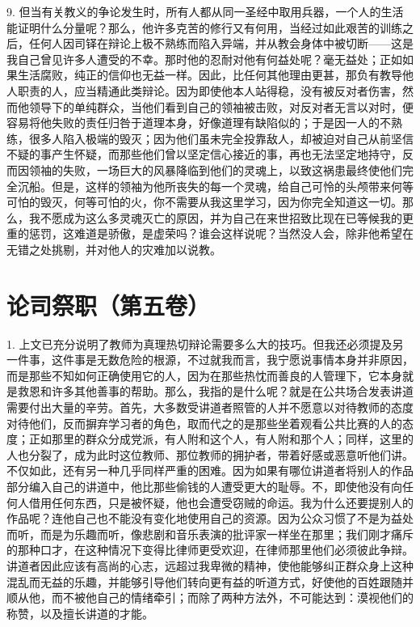 9. 但当有关教义的争论发生时，所有人都从同一圣经中取用兵器，一个人的生活能证明什么分量呢？那么，他许多克苦的修行又有何用，当经过如此艰苦的训练之后，任何人因司铎在辩论上极不熟练而陷入异端，并从教会身体中被切断——这是我自己曾见许多人遭受的不幸。那时他的忍耐对他有何益处呢？毫无益处；正如如果生活腐败，纯正的信仰也无益一样。因此，比任何其他理由更甚，那负有教导他人职责的人，应当精通此类辩论。因为即使他本人站得稳，没有被反对者伤害，然而他领导下的单纯群众，当他们看到自己的领袖被击败，对反对者无言以对时，便容易将他失败的责任归咎于道理本身，好像道理有缺陷似的；于是因一人的不熟练，很多人陷入极端的毁灭；因为他们虽未完全投靠敌人，却被迫对自己从前坚信不疑的事产生怀疑，而那些他们曾以坚定信心接近的事，再也无法坚定地持守，反而因领袖的失败，一场巨大的风暴降临到他们的灵魂上，以致这祸患最终使他们完全沉船。但是，这样的领袖为他所丧失的每一个灵魂，给自己可怜的头颅带来何等可怕的毁灭，何等可怕的火，你不需要从我这里学习，因为你完全知道这一切。那么，我不愿成为这么多灵魂灭亡的原因，并为自己在来世招致比现在已等候我的更重的惩罚，这难道是骄傲，是虚荣吗？谁会这样说呢？当然没人会，除非他希望在无错之处挑剔，并对他人的灾难加以说教。\par



\section{论司祭职（第五卷）}

1. 上文已充分说明了教师为真理热切辩论需要多么大的技巧。但我还必须提及另一件事，这件事是无数危险的根源，不过就我而言，我宁愿说事情本身并非原因，而是那些不知如何正确使用它的人，因为在那些热忱而善良的人管理下，它本身就是救恩和许多其他善事的帮助。那么，我指的是什么呢？就是在公共场合发表讲道需要付出大量的辛劳。首先，大多数受讲道者照管的人并不愿意以对待教师的态度对待他们，反而摒弃学习者的角色，取而代之的是那些坐着观看公共比赛的人的态度；正如那里的群众分成党派，有人附和这个人，有人附和那个人；同样，这里的人也分裂了，成为此时这位教师、那位教师的拥护者，带着好感或恶意听他们讲。不仅如此，还有另一种几乎同样严重的困难。因为如果有哪位讲道者将别人的作品部分编入自己的讲道中，他比那些偷钱的人遭受更大的耻辱。不，即使他没有向任何人借用任何东西，只是被怀疑，他也会遭受窃贼的命运。我为什么还要提别人的作品呢？连他自己也不能没有变化地使用自己的资源。因为公众习惯了不是为益处而听，而是为乐趣而听，像悲剧和音乐表演的批评家一样坐在那里；我们刚才痛斥的那种口才，在这种情况下变得比律师更受欢迎，在律师那里他们必须彼此争辩。讲道者因此应该有高尚的心志，远超过我卑微的精神，使他能够纠正群众身上这种混乱而无益的乐趣，并能够引导他们转向更有益的听道方式，好使他的百姓跟随并顺从他，而不被他自己的情绪牵引；而除了两种方法外，不可能达到：漠视他们的称赞，以及擅长讲道的才能。\par

